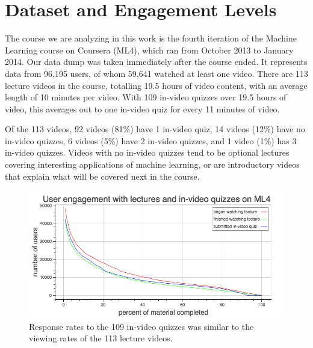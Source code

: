 \documentclass{sigchi}
\begin{document}
\section{Dataset and Engagement Levels}

The course we are analyzing in this work is the fourth iteration of the Machine Learning course on Coursera (ML4), which ran from October 2013 to January 2014. Our data dump was taken immediately after the course ended. It represents data from 96,195 users, of whom 59,641 watched at least one video. There are 113 lecture videos in the course, totalling 19.5 hours of video content, with an average length of 10 minutes per video.  With 109  in-video quizzes over 19.5 hours of video, this averages out to one in-video quiz for every 11 minutes of video.

Of the 113 videos, 92 videos (81\%) have 1 in-video quiz, 14 videos (12\%) have no in-video quizzes, 6 videos (5\%) have 2 in-video quizzes, and 1 video (1\%) has 3 in-video quizzes. Videos with no in-video quizzes tend to be optional lectures covering interesting applications of machine learning, or are introductory videos that explain what will be covered next in the course. %

\begin{figure}
\includegraphics[width=1.0\columnwidth]{user-engagement-with-material}
\caption{Response rates to the 109 in-video quizzes was similar to the viewing rates of the 113 lecture videos.}
\label{fig:user-engagement-with-material}
\end{figure}
\end{document}

